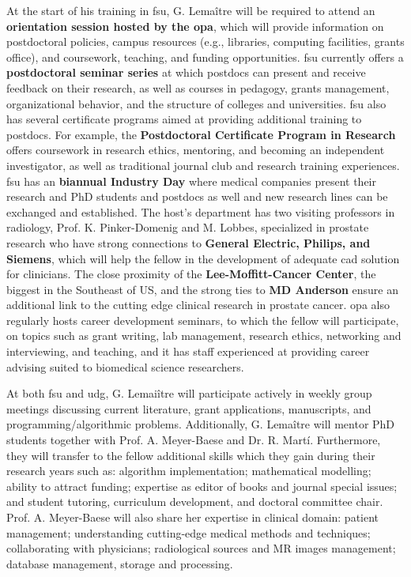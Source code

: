 At the start of his training in \ac{fsu}, G. Lema\^itre will be required to attend an \textbf{orientation session hosted by the \ac{opa}}, which will provide information on postdoctoral policies, campus resources (e.g., libraries, computing facilities, grants office), and coursework, teaching, and funding opportunities.
\ac{fsu} currently offers a \textbf{postdoctoral seminar series} at which postdocs can present and receive feedback on their research, as well as courses in pedagogy, grants management, organizational behavior, and the structure of colleges and universities.
\ac{fsu} also has several certificate programs aimed at providing additional training to postdocs.
For example, the \textbf{Postdoctoral Certificate Program in Research} offers coursework in research ethics, mentoring, and becoming an independent investigator, as well as traditional journal club and research training experiences.
\ac{fsu} has an \textbf{biannual Industry Day} where medical companies present their research and PhD students and postdocs as well and new research lines can be exchanged and established.
The host's department has two visiting professors in radiology, Prof. K. Pinker-Domenig and M. Lobbes, specialized in prostate research who have strong connections to \textbf{General Electric, Philips, and Siemens}, which will help the fellow in the development of adequate \ac{cad} solution for clinicians.
The close proximity of the \textbf{Lee-Moffitt-Cancer Center}, the biggest in the Southeast of US, and the strong ties to \textbf{MD Anderson} ensure an additional link to the cutting edge clinical research in prostate cancer.
\ac{opa} also regularly hosts career development seminars, to which the fellow will participate, on topics such as grant writing, lab management, research ethics, networking and interviewing, and teaching, and it has staff experienced at providing career advising suited to biomedical science researchers.

At both \ac{fsu} and \ac{udg}, G. Lemai\^itre will participate actively in weekly group meetings discussing current literature, grant applications, manuscripts, and programming/algorithmic problems.
Additionally, G. Lema\^itre will mentor PhD students together with Prof. A. Meyer-Baese and Dr. R. Mart\'i.
Furthermore, they will transfer to the fellow additional skills which they gain during their research years such as: algorithm implementation; mathematical modelling; ability to attract funding; expertise as editor of books and journal special issues; and student tutoring, curriculum development, and doctoral committee chair.
Prof. A. Meyer-Baese will also share her expertise in clinical domain: patient management; understanding cutting-edge medical methods and techniques; collaborating with physicians; radiological sources and MR images management; database management, storage and processing.

